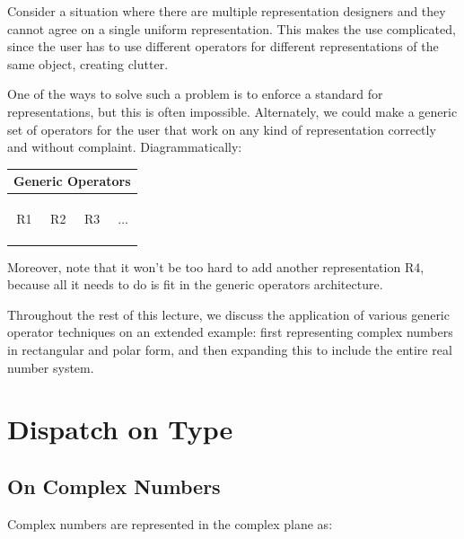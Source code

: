 \documentclass[9pt]{report}
\begin{document}
Consider a situation where there are multiple representation
designers and they cannot agree on a single uniform representation.
This makes the use complicated, since the user has to use different
operators for different representations of the same object, creating
clutter.

One of the ways to solve such a problem is to enforce a standard for
representations, but this is often impossible. Alternately, we could
make a generic set of operators for the user that work on any kind
of representation correctly and without complaint. Diagrammatically:

\begin{center}
\begin{tabular}{|c|c|c|c|}
\hline
\multicolumn{4}{|c|}{Generic Operators}\\
\hline
&&&\\
&&&\\
&&&\\
R1 & R2 & R3 & $\dots$\\
&&&\\
&&&\\
&&&\\
\hline
\end{tabular}
\end{center}

Moreover, note that it won't be too hard to add another
representation R4, because all it needs to do is fit in the
generic operators architecture.

Throughout the rest of this lecture, we discuss the application of
various generic operator techniques on an extended example: first
representing complex numbers in rectangular and polar form, and then
expanding this to include the entire real number system.

\section{Dispatch on Type}
\label{sec:org32e1af6}

\subsection{On Complex Numbers}
\label{sec:org3a2a3df}
Complex numbers are represented in the complex plane as:
\end{document}
